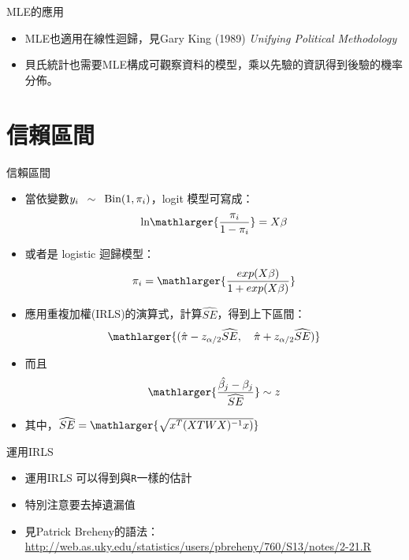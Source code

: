 \documentclass[border=10pt]{beamer}
\begin{document}
\begin{frame}{MLE的應用}
\begin{itemize} 
\item MLE也適用在線性迴歸，見Gary King (1989) \textit{Unifying Political Methodology}
\item 貝氏統計也需要MLE構成可觀察資料的模型，乘以先驗的資訊得到後驗的機率分佈。
\end{itemize}
\end{frame}
\section{信賴區間}
\begin{frame}{信賴區間}
\begin{itemize} 
\item 當依變數$y_{i}\hspace{.5em}\sim\hspace{.5em} \text{Bin}(1,\pi_{i})$，logit 模型可寫成：
\begin{equation}
\text{ln}\mathlarger{\frac{\pi_{i}}{1-\pi_{i}}}=X\beta 
\end{equation}
\item 或者是 logistic 迴歸模型：
\begin{equation}
\pi_{i}=\mathlarger{\frac{exp(X\beta)}{1+exp(X\beta)}} 
\end{equation}
\item 應用重複加權(IRLS)的演算式，計算$\widehat{SE}$，得到上下區間：
\[ \mathlarger{(\hat{\pi}-z_{\alpha/2}\widehat{SE},\hspace{1em}\hat{\pi}+z_{\alpha/2}\widehat{SE})} \]
\item 而且
\[\mathlarger{\frac{\hat{\beta_{j}} - \beta_{j}}{\widehat{SE}}}\sim z \]
\item 其中，$\widehat{SE}=\mathlarger{\sqrt{x^{T}(X{T}WX)^{-1}x)}}$
\end{itemize}
\end{frame}
\begin{frame}{運用IRLS}
\begin{itemize}
\item 運用IRLS 可以得到與\texttt{R}一樣的估計
\item 特別注意要去掉遺漏值
\item 見Patrick Breheny的語法：\url{http://web.as.uky.edu/statistics/users/pbreheny/760/S13/notes/2-21.R}
\end{itemize}
\end{frame}
\end{document}
